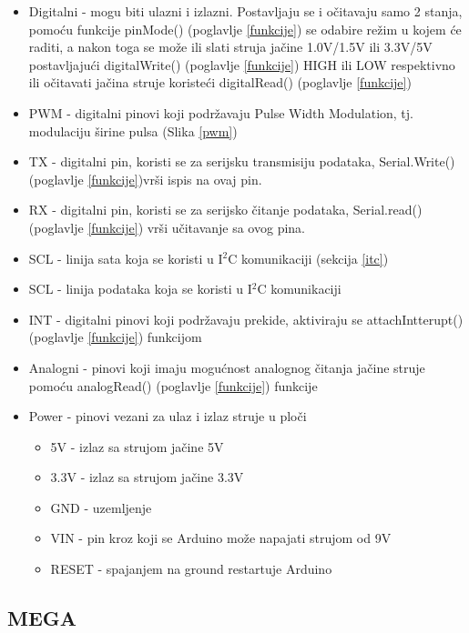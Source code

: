 \documentclass[../Document.tex]{subfiles}
\begin{document}
\begin{itemize}
  \item Digitalni - mogu biti ulazni i izlazni. Postavljaju se i očitavaju samo 2 stanja, pomoću funkcije pinMode() (poglavlje \ref{funkcije}) se odabire režim u kojem će raditi, a nakon toga se može ili slati struja jačine 1.0V/1.5V ili 3.3V/5V postavljajući digitalWrite() (poglavlje \ref{funkcije}) HIGH ili LOW respektivno ili očitavati jačina struje koristeći digitalRead() (poglavlje \ref{funkcije})
  \item PWM - digitalni pinovi koji podržavaju Pulse Width Modulation, tj. modulaciju širine pulsa (Slika \ref{pwm})
  \item TX - digitalni pin, koristi se za serijsku transmisiju podataka, Serial.Write()  (poglavlje \ref{funkcije})vrši ispis na ovaj pin.
  \item RX - digitalni pin, koristi se za serijsko čitanje podataka, Serial.read() (poglavlje \ref{funkcije}) vrši učitavanje sa ovog pina.
  \item SCL - linija sata koja se koristi u I$^2$C komunikaciji (sekcija \ref{itc})
  \item SCL - linija podataka koja se koristi u I$^2$C komunikaciji
  \item INT - digitalni pinovi koji podržavaju prekide, aktiviraju se attachIntterupt() (poglavlje \ref{funkcije}) funkcijom
  \item Analogni - pinovi koji imaju mogućnost analognog čitanja jačine struje pomoću analogRead() (poglavlje \ref{funkcije}) funkcije
  \item Power - pinovi vezani za ulaz i izlaz struje u ploči
        \begin{itemize}
          \item 5V - izlaz sa strujom jačine 5V
          \item 3.3V - izlaz sa strujom jačine 3.3V
          \item GND - uzemljenje
          \item VIN - pin kroz koji se Arduino može napajati strujom od 9V
          \item RESET - spajanjem na ground restartuje Arduino
        \end{itemize}
\end{itemize}

\subsection{MEGA}
\end{document}
